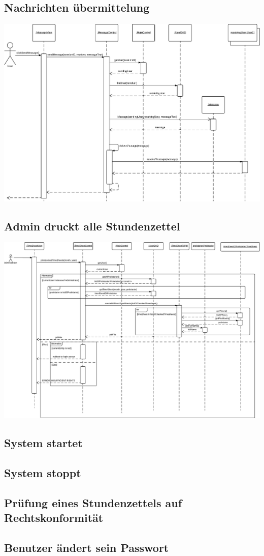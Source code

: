     \subsection{Nachrichten übermittelung}
        \includegraphics[width=\linewidth]{"Diagramms/sequenzes/message_delivery.pdf"}\\
    \subsection{Admin druckt alle Stundenzettel}
        \includegraphics[width=\linewidth]{"Diagramms/sequenzes/admin_prints_timesheets.pdf"}\\
    \subsection{System startet}
    \subsection{System stoppt}
    \subsection{Prüfung eines Stundenzettels auf Rechtskonformität}
    \subsection{Benutzer ändert sein Passwort}

\newpage
